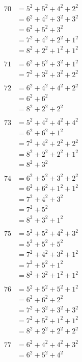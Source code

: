 \documentclass{article}
\numberwithin{equation}{section}
\begin{document}
\begin{multicols}{3}
\begin{align*}
\\
70 & = 5^2 + 5^2 + 4^2 + 2^2\\
   & = 6^2 + 4^2 + 3^2 + 3^2\\
   & = 6^2 + 5^2 + 3^2\\
   & = 7^2 + 4^2 + 2^2 + 1^2\\
   & = 8^2 + 2^2 + 1^2 + 1^2\\
\\
71 & = 6^2 + 5^2 + 3^2 + 1^2\\
   & = 7^2 + 3^2 + 3^2 + 2^2\\
\\
72 & = 6^2 + 4^2 + 4^2 + 2^2\\
   & = 6^2 + 6^2\\
   & = 8^2 + 2^2 + 2^2\\
\\
73 & = 5^2 + 4^2 + 4^2 + 4^2\\
   & = 6^2 + 6^2 + 1^2\\
   & = 7^2 + 4^2 + 2^2 + 2^2\\
   & = 8^2 + 2^2 + 2^2 + 1^2\\
   & = 8^2 + 3^2\\
\\
74 & = 6^2 + 5^2 + 3^2 + 2^2\\
   & = 6^2 + 6^2 + 1^2 + 1^2\\
   & = 7^2 + 4^2 + 3^2\\
   & = 7^2 + 5^2\\
   & = 8^2 + 3^2 + 1^2\\
\\
75 & = 5^2 + 5^2 + 4^2 + 3^2\\
   & = 5^2 + 5^2 + 5^2\\
   & = 7^2 + 4^2 + 3^2 + 1^2\\
   & = 7^2 + 5^2 + 1^2\\
   & = 8^2 + 3^2 + 1^2 + 1^2\\
\end{align*}
\vspace{\fill}\columnbreak
\begin{align*}
76 & = 5^2 + 5^2 + 5^2 + 1^2\\
   & = 6^2 + 6^2 + 2^2\\
   & = 7^2 + 3^2 + 3^2 + 3^2\\
   & = 7^2 + 5^2 + 1^2 + 1^2\\
   & = 8^2 + 2^2 + 2^2 + 2^2\\
\\
77 & = 6^2 + 4^2 + 4^2 + 3^2\\
   & = 6^2 + 5^2 + 4^2\\

\end{align*}
\end{multicols}
\end{document}
